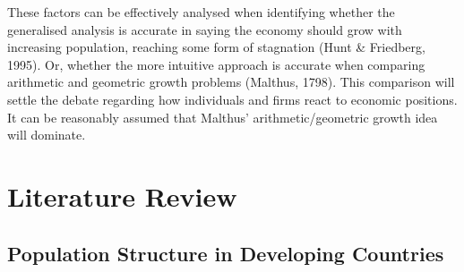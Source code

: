\documentclass[11pt, english]{article}
\begin{document}
	These factors can be effectively analysed when identifying whether the generalised analysis is accurate in saying the economy should grow with increasing population, reaching some form of stagnation (Hunt \& Friedberg, 1995). Or, whether the more intuitive approach is accurate when comparing arithmetic and geometric growth problems (Malthus, 1798). This comparison will settle the debate regarding how individuals and firms react to economic positions. It can be reasonably assumed that Malthus' arithmetic/geometric growth idea will dominate.

\newpage

\section{Literature Review}

	\subsection{Population Structure in Developing Countries}
\end{document}
